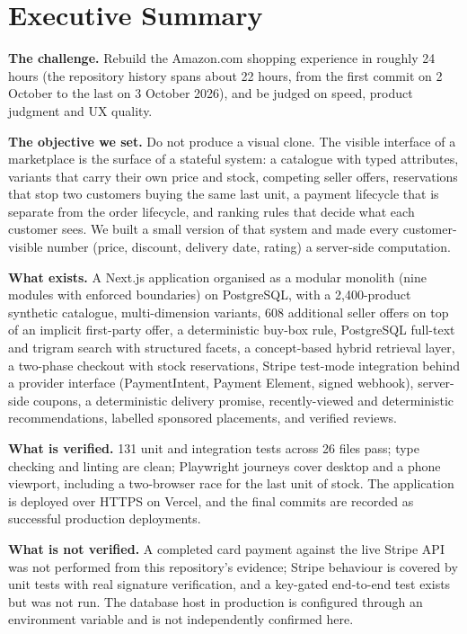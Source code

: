 \chapter*{Executive Summary}

\textbf{The challenge.} Rebuild the Amazon.com shopping experience in roughly 24 hours (the repository history spans about 22 hours, from the first commit on 2 October to the last on 3 October 2026), and be judged on speed, product judgment and UX quality.

\textbf{The objective we set.} Do not produce a visual clone. The visible interface of a marketplace is the surface of a stateful system: a catalogue with typed attributes, variants that carry their own price and stock, competing seller offers, reservations that stop two customers buying the same last unit, a payment lifecycle that is separate from the order lifecycle, and ranking rules that decide what each customer sees. We built a small version of that system and made every customer-visible number (price, discount, delivery date, rating) a server-side computation.

\textbf{What exists.} A Next.js application organised as a modular monolith (nine modules with enforced boundaries) on PostgreSQL, with a 2,400-product synthetic catalogue, multi-dimension variants, 608 additional seller offers on top of an implicit first-party offer, a deterministic buy-box rule, PostgreSQL full-text and trigram search with structured facets, a concept-based hybrid retrieval layer, a two-phase checkout with stock reservations, Stripe test-mode integration behind a provider interface (PaymentIntent, Payment Element, signed webhook), server-side coupons, a deterministic delivery promise, recently-viewed and deterministic recommendations, labelled sponsored placements, and verified reviews.

\textbf{What is verified.} 131 unit and integration tests across 26 files pass; type checking and linting are clean; Playwright journeys cover desktop and a phone viewport, including a two-browser race for the last unit of stock. The application is deployed over HTTPS on Vercel, and the final commits are recorded as successful production deployments.

\textbf{What is not verified.} A completed card payment against the live Stripe API was not performed from this repository's evidence; Stripe behaviour is covered by unit tests with real signature verification, and a key-gated end-to-end test exists but was not run. The database host in production is configured through an environment variable and is not independently confirmed here.

